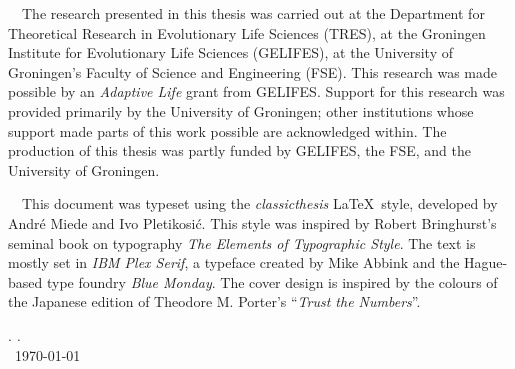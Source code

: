 \thispagestyle{empty}

\hfill

\vfill


\noindent \adftripleflourishright~~The research presented in this thesis was carried out at the Department for Theoretical Research in Evolutionary Life Sciences (TRES), at the Groningen Institute for Evolutionary Life Sciences (GELIFES), at the University of Groningen's Faculty of Science and Engineering (FSE).
This research was made possible by an \emph{Adaptive Life} grant from GELIFES.
Support for this research was provided primarily by the University of Groningen; other institutions whose support made parts of this work possible are acknowledged within.
The production of this thesis was partly funded by GELIFES, the FSE, and the University of Groningen.

\medskip

\noindent \adftripleflourishright~~This document was typeset using the \emph{classicthesis} \LaTeX~style, developed by Andr\'e Miede and Ivo Pletikosić.
This style was inspired by Robert Bringhurst's seminal book on typography \emph{The Elements of Typographic Style}.
The text is mostly set in \emph{IBM Plex Serif}, a typeface created by Mike Abbink and the Hague-based type foundry \emph{Blue Monday}.
The cover design is inspired by the colours of the Japanese edition of Theodore M. Porter's ``\emph{Trust the Numbers}''.

\bigskip

\noindent\finalVersionString

\noindent\myName. \textit{\myTitle.}%
\\
\noindent \textcopyright\ \today
